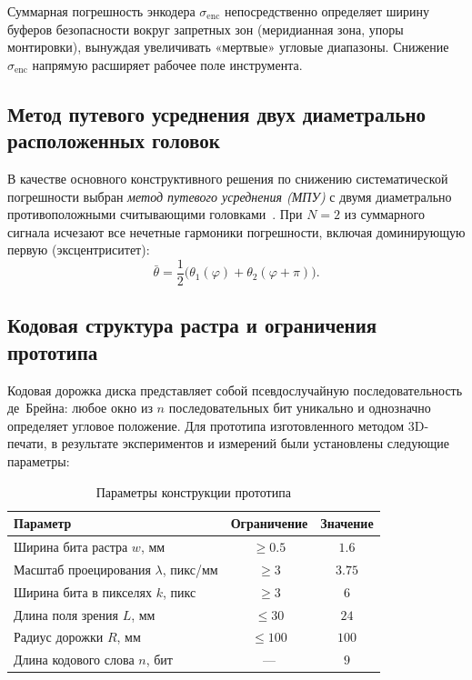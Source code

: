 Суммарная погрешность энкодера $\sigma_{\mathrm{enc}}$ непосредственно определяет ширину буферов безопасности вокруг запретных зон (меридианная зона, упоры монтировки), вынуждая увеличивать «мертвые» угловые диапазоны. Снижение $\sigma_{\mathrm{enc}}$ напрямую расширяет рабочее поле инструмента.

\subsection{Метод путевого усреднения двух диаметрально расположенных головок}

В качестве основного конструктивного решения по снижению систематической погрешности выбран \emph{метод путевого усреднения (МПУ)} с двумя диаметрально противоположными считывающими головками~\cite{mpu-ionak,mpu-bachish,heidenhain-modular-angle-encoders}. При $N=2$ из суммарного сигнала исчезают все нечетные гармоники погрешности, включая доминирующую первую (эксцентриситет):
\begin{equation*}
    \bar{\theta} = \frac{1}{2}\bigl(\theta_1(\varphi) + \theta_2(\varphi + \pi)\bigr).
\end{equation*}

\subsection{Кодовая структура растра и ограничения прототипа}

Кодовая дорожка диска представляет собой псевдослучайную последовательность де~Брейна: любое окно из $n$ последовательных бит уникально и однозначно определяет угловое положение. Для прототипа изготовленного методом 3D-печати, в результате экспериментов и измерений были установлены следующие параметры:

\begin{table}[ht!]
    \centering
    \begin{tabular}{l|c|c}
        \hline
        Параметр & Ограничение & Значение \\
        \hline
        Ширина бита растра $w$, мм & $\geq 0.5$ & $1.6$ \\
        Масштаб проецирования $\lambda$, пикс/мм & $\geq 3$ & $3.75$ \\
        Ширина бита в пикселях $k$, пикс & $\geq 3$ & $6$ \\
        Длина поля зрения $L$, мм & $\leq 30$ & $24$ \\
        Радиус дорожки $R$, мм & $\leq 100$ & $100$ \\
        Длина кодового слова $n$, бит & --- & $9$ \\
        \hline
    \end{tabular}
    \caption{Параметры конструкции прототипа}
\end{table}

